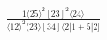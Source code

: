 \documentclass[varwidth, border=5pt]{standalone}
\begin{document}
\begin{my}
$\begin{gathered}
\scriptscriptstyle\frac{1⟨25⟩^2[23]^2⟨24⟩}{⟨12⟩^2⟨23⟩[34]⟨2|1+5|2]}
\end{gathered}$
\end{my}
\end{document}
